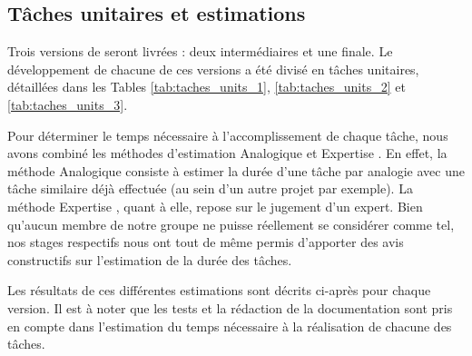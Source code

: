     \subsection{Tâches unitaires et estimations}
    \label{subsec:taches_unitaires}

        Trois versions de \glasir{} seront livrées : deux intermédiaires et une finale. Le développement de chacune de ces versions a été divisé en tâches unitaires, détaillées dans les {\sc Tables} \ref{tab:taches_units_1}, \ref{tab:taches_units_2} et \ref{tab:taches_units_3}.
        
        Pour déterminer le temps nécessaire à l'accomplissement de chaque tâche, nous avons combiné les méthodes d’estimation \og Analogique \fg{} et \og Expertise \fg{}. En effet, la méthode \og Analogique \fg{} consiste à estimer la durée d'une tâche par analogie avec une tâche similaire déjà effectuée (au sein d'un autre projet par exemple). La méthode \og Expertise \fg{}, quant à elle, repose sur le jugement d'un expert. Bien qu'aucun membre de notre groupe ne puisse réellement se considérer comme tel, nos stages respectifs nous ont tout de même permis d'apporter des avis constructifs sur l'estimation de la durée des tâches.
        
        Les résultats de ces différentes estimations sont décrits ci-après pour chaque version. Il est à noter que les tests et la rédaction de la documentation sont pris en compte dans l'estimation du temps nécessaire à la réalisation de chacune des tâches.
        

